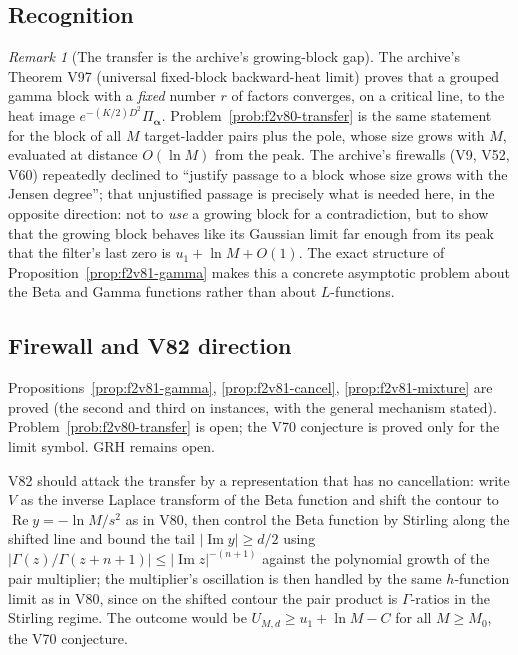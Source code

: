 \documentclass[11pt]{article}
\theoremstyle{definition}
\theoremstyle{remark}
\newtheorem{remark}[theorem]{Remark}
\begin{document}
\subsection{Recognition}

\begin{remark}[The transfer is the archive's growing-block gap]
\label{rem:f2v81-gap}
The archive's Theorem V97 (universal fixed-block backward-heat limit)
proves that a grouped gamma block with a \emph{fixed} number \(r\) of
factors converges, on a critical line, to the heat image
\(e^{-(K/2)D^2}\Pi_{\bm\alpha}\).  Problem~\ref{prob:f2v80-transfer} is
the same statement for the block of all \(M\) target-ladder pairs plus
the pole, whose size grows with \(M\), evaluated at distance
\(O(\ln M)\) from the peak.  The archive's firewalls (V9, V52, V60)
repeatedly declined to ``justify passage to a block whose size grows
with the Jensen degree''; that unjustified passage is precisely what is
needed here, in the opposite direction: not to \emph{use} a growing
block for a contradiction, but to show that the growing block behaves
like its Gaussian limit far enough from its peak that the filter's last
zero is \(u_1+\ln M+O(1)\).  The exact structure of
Proposition~\ref{prop:f2v81-gamma} makes this a concrete asymptotic
problem about the Beta and Gamma functions rather than about
\(L\)-functions.
\end{remark}

\subsection*{Firewall and V82 direction}
\label{fire:f2v81}
Propositions~\ref{prop:f2v81-gamma}, \ref{prop:f2v81-cancel},
\ref{prop:f2v81-mixture} are proved (the second and third on instances,
with the general mechanism stated).  Problem~\ref{prob:f2v80-transfer}
is open; the V70 conjecture is proved only for the limit symbol.  GRH
remains open.

V82 should attack the transfer by a representation that has no
cancellation: write \(V\) as the inverse Laplace transform of the Beta
function and shift the contour to \(\operatorname{Re}y=-\ln M/s^2\) as in
V80, then control the Beta function by Stirling along the shifted line
and bound the tail \(|\operatorname{Im}y|\ge d/2\) using
\(|\Gamma(z)/\Gamma(z+n+1)|\le|\operatorname{Im}z|^{-(n+1)}\) against the
polynomial growth of the pair multiplier; the multiplier's oscillation
is then handled by the same \(h\)-function limit as in V80, since on the
shifted contour the pair product is \(\Gamma\)-ratios in the Stirling
regime.  The outcome would be \(U_{M,d}\ge u_1+\ln M-C\) for all
\(M\ge M_0\), the V70 conjecture.
\end{document}
